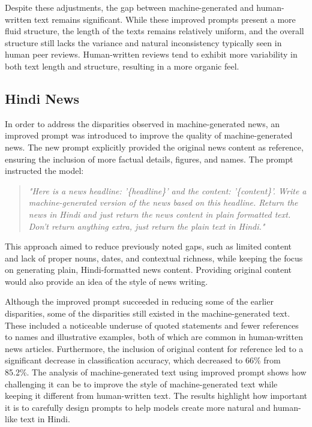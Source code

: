 Despite these adjustments, the gap between machine-generated and human-written text remains significant. While these improved prompts present a more fluid structure, the length of the texts remains relatively uniform, and the overall structure still lacks the variance and natural inconsistency typically seen in human peer reviews. Human-written reviews tend to exhibit more variability in both text length and structure, resulting in a more organic feel.




\subsection{Hindi News}
In order to address the disparities observed in machine-generated news, an improved prompt was introduced to improve the quality of machine-generated news. The new prompt explicitly provided the original news content as reference, ensuring the inclusion of more factual details, figures, and names. The prompt instructed the model: 
\begin{quote}
\textit{"Here is a news headline: '\{headline\}' and the content: '\{content\}'. Write a machine-generated version of the news based on this headline. Return the news in Hindi and just return the news content in plain formatted text. Don't return anything extra, just return the plain text in Hindi."}
\end{quote}
This approach aimed to reduce previously noted gaps, such as limited content and lack of proper nouns, dates, and contextual richness, while keeping the focus on generating plain, Hindi-formatted news content. Providing original content would also provide an idea of the style of news writing.

Although the improved prompt succeeded in reducing some of the earlier disparities, some of the disparities still existed in the machine-generated text. These included a noticeable underuse of quoted statements and fewer references to names and illustrative examples, both of which are common in human-written news articles. Furthermore, the inclusion of original content for reference led to a significant decrease in classification accuracy, which decreased to 66\% from 85.2\%. The analysis of machine-generated text using improved prompt shows how challenging it can be to improve the style of machine-generated text while keeping it different from human-written text. The results highlight how important it is to carefully design prompts to help models create more natural and human-like text in Hindi.


